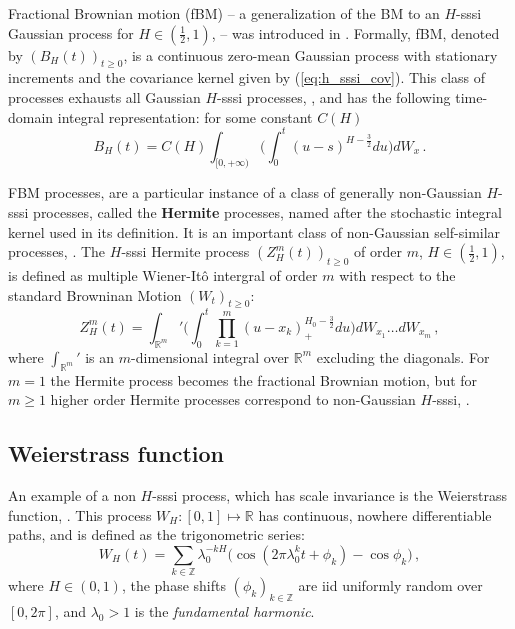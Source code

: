 \documentclass[a4paper]{article}
\newcommand{\Real}{\mathbb{R}}
\begin{document}
Fractional Brownian motion (fBM) -- a generalization of the BM to an $H$-sssi Gaussian
process for $H \in (\frac{1}{2}, 1)$, -- was introduced in \cite{doi:10.1137/1010093}.
Formally, fBM, denoted by $(B_H(t))_{t\geq0}$, is a continuous zero-mean Gaussian
process with stationary increments and the covariance kernel given by (\ref{eq:h_sssi_cov}).
This class of processes exhausts all Gaussian $H$-sssi processes, \cite{embrechts2002},
and has the following time-domain integral representation: for some constant $C(H)$
\begin{equation}\label{eq:fbm_int_repr}
    B_H(t) = C(H) \int_{[0,+\infty)} \biggl(
            \int_0^t (u-s)^{H-\frac{3}{2}} du
        \biggr) dW_x \,.
\end{equation}

FBM processes, are a particular instance of a class of generally non-Gaussian $H$-sssi
processes, called the \textbf{Hermite} processes, named after the stochastic integral
kernel used in its definition. It is an important class of non-Gaussian self-similar
processes, \cite{maejima2007}. The $H$-sssi Hermite process $(Z_H^m(t))_{t\geq 0}$
of order $m$, $H \in (\frac{1}{2}, 1)$, is defined as multiple Wiener-It\^o intergral
of order $m$ with respect to the standard Browninan Motion $(W_t)_{t\geq0}$:
\begin{equation}\label{eq:def_hermite}
    Z_H^m(t) = \int_{\Real^m}' \Biggl(
            \int_0^t \prod_{k=1}^m (u - x_k)_+^{H_0-\frac{3}{2}} du
        \Biggr) dW_{x_1} \ldots dW_{x_m}\,,
\end{equation}
where $\int_{\Real^m}'$ is an $m$-dimensional integral over $\Real^m$ excluding the
diagonals. For $m=1$ the Hermite process becomes the fractional Brownian motion,
but for $m\geq 1$ higher order Hermite processes correspond to non-Gaussian $H$-sssi,
\cite{Bai20141710,Chronopoulou:1114288,embrechts2000introduction}.


\subsection{Weierstrass function} %
\label{sub:weierstrass_function}

An example of a non $H$-sssi process, which has scale invariance is the Weierstrass
function, \cite{decrouez2013}. This process $W_H:[0,1] \mapsto \Real$ has continuous,
nowhere differentiable paths, and is defined as the trigonometric series:
\begin{equation} \label{eq:def_weir}
    W_H(t) = \sum_{k\in \mathbb{Z}} \lambda_0^{-k H} \bigl(
            \cos(2\pi \lambda_0^k t + \phi_k) - \cos \phi_k
        \bigr) \,,
\end{equation}
where $H\in(0, 1)$, the phase shifts $(\phi_k)_{k\in\mathbb{Z}}$ are iid uniformly
random over $[0, 2\pi]$, and $\lambda_0 > 1$ is the \emph{fundamental harmonic}.
\end{document}
